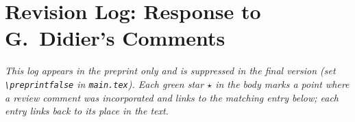 \documentclass[12pt]{article}
\newif\ifpreprint
\begin{document}



\setcounter{page}{2}




\tableofcontents
\clearpage


\setcounter{page}{1}








\appendix










\ifpreprint
\clearpage
{}
{}
\section*{Revision Log: Response to G.\ Didier's Comments}

\noindent\emph{This log appears in the preprint only and is suppressed in the final
version (set \texttt{\textbackslash preprintfalse} in \texttt{main.tex}). Each
green star \textcolor{thesisRev}{$\star$} in the body marks a point where a review
comment was incorporated and links to the matching entry below; each entry links
back to its place in the text.}
\end{document}
